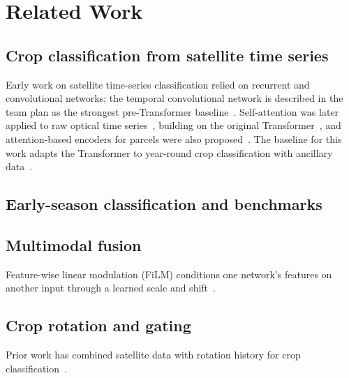 \section{Related Work}
\label{sec:related}

\subsection{Crop classification from satellite time series}
Early work on satellite time-series classification relied on recurrent and convolutional networks; the temporal convolutional network is described in the team plan as the strongest pre-Transformer baseline~\cite{pelletier2019}. Self-attention was later applied to raw optical time series~\cite{russwurm2020}, building on the original Transformer~\cite{vaswani2017}, and attention-based encoders for parcels were also proposed~\cite{garnot2020}. The baseline for this work adapts the Transformer to year-round crop classification with ancillary data~\cite{genemola2026}. 

\subsection{Early-season classification and benchmarks}

\subsection{Multimodal fusion}
Feature-wise linear modulation (FiLM) conditions one network's features on another input through a learned scale and shift~\cite{perez2018film}. 

\subsection{Crop rotation and gating}
Prior work has combined satellite data with rotation history for crop classification~\cite{barriere2024}. 

